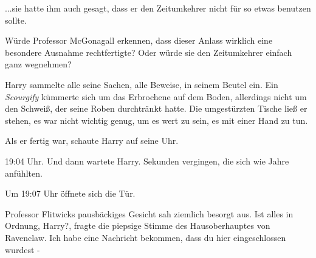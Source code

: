 ...sie hatte ihm auch gesagt, dass er den Zeitumkehrer nicht für so etwas
benutzen sollte.

Würde Professor McGonagall erkennen, dass dieser Anlass wirklich eine besondere
Ausnahme rechtfertigte? Oder würde sie den Zeitumkehrer einfach ganz wegnehmen?

Harry sammelte alle seine Sachen, alle Beweise, in seinem Beutel ein. Ein
\emph{Scourgify} kümmerte sich um das Erbrochene auf dem Boden, allerdings nicht
um den Schweiß, der seine Roben durchtränkt hatte. Die umgestürzten Tische ließ
er stehen, es war nicht wichtig genug, um es wert zu sein, es mit einer Hand zu
tun.

Als er fertig war, schaute Harry auf seine Uhr.

19:04 Uhr. Und dann wartete Harry. Sekunden vergingen, die sich wie Jahre
anfühlten.

Um 19:07 Uhr öffnete sich die Tür.

Professor Flitwicks pausbäckiges Gesicht sah ziemlich besorgt aus. \glqq{}Ist
alles in Ordnung, Harry?\grqq{}, fragte die piepsige Stimme des Hausoberhauptes
von Ravenclaw. \glqq{}Ich habe eine Nachricht bekommen, dass du hier
eingeschlossen wurdest -\grqq{}
